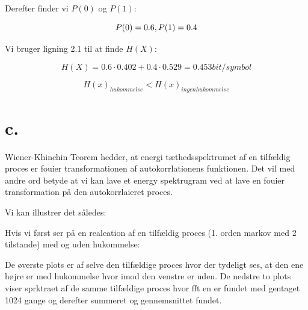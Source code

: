 Derefter finder vi $P(0)$ og $P(1)$:

\begin{equation}
P(0) = 0.6 \\,\\P(1) = 0.4
\end{equation}

Vi bruger ligning 2.1 til at finde $H(X)$:

 \begin{equation}
H(X) = 0.6\cdot 0.402+0.4 \cdot 0.529 = 0.453 bit/symbol
\end{equation} 



\begin{equation}
H(x)_{hukommelse}<H(x)_{ingen hukommelse}
\end{equation}



\section{c.}

Wiener-Khinchin Teorem hedder, at energi tæthedsspektrumet af en tilfældig proces er fouier transformationen af autokorrlationens funktionen. Det vil med andre ord betyde at vi kan lave et energy spektrugram ved at lave en fouier transformation på den autokorrlaieret proces.
 
Vi kan illustrer det således:\\



Hvis vi først ser på en realeation af en tilfældig proces (1. orden markov med 2 tilstande) med og uden hukommelse:

De øverste plots er af selve den tilfældige proces hvor der tydeligt ses, at den ene højre er med hukommelse hvor imod den venstre er uden. De nedstre to plots viser sprktraet af de samme tilfældige proces hvor fft en er fundet med gentaget 1024 gange og derefter summeret og gennemsnittet fundet.

